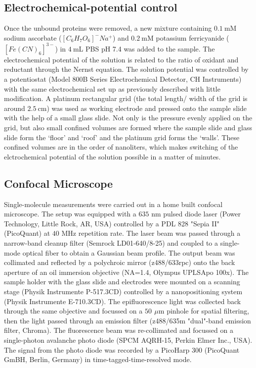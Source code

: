 \documentclass[journal=jacsat,manuscript=article]{achemso}
\newcommand{\um}{\ensuremath{\,\mu\textrm{m}}}
\begin{document}
\subsection{Electrochemical-potential control}
Once the unbound proteins were removed, a new mixture containing $0.1~$mM sodium ascorbate ($[C_6H_7O_6]^-Na^+$) and 
$0.2~$mM potassium ferricyanide ($[Fe(CN)_6]^{3-}$) in $4~$mL PBS pH 7.4 was added to the sample. The electrochemical 
potential of the solution is related to the ratio of oxidant and reductant through the Nernst equation. The solution 
potential was controlled by a potentiostat (Model 800B Series Electrochemical Detector, CH Instruments) with the same 
electrochemical set up as previously described\cite{zhang2017gold} with little modification. A platinum rectangular 
grid (the total length/ width of the grid is around $2.5~$cm) was used as working electrode and pressed onto the 
sample slide with the help of a small glass slide. Not only is the pressure evenly applied on the grid, but also small 
confined volumes are formed where the sample slide and glass slide form the `floor' and `roof' and the platinum grid 
forms the `walls'. These confined volumes are in the order of nanoliters, which makes switching of the elctrochemical 
potential of the solution possible in a matter of minutes.
\subsection{Confocal Microscope}
Single-molecule measurements were carried out in a home built confocal microscope. The setup was equipped with a 
$635$ nm pulsed diode laser (Power Technology, Little Rock, AR, USA) controlled by a PDL 828 "Sepia II" (PicoQuant) 
at $40$ MHz repetition rate. The laser beam was passed through a narrow-band cleanup filter (Semrock LD01-640/8-25) 
and coupled to a single-mode optical fiber to obtain a Gaussian beam profile. The output beam was collimated and 
reflected by a polychroic mirror (z488/633rpc) onto the back aperture of an oil immersion objective 
(NA=1.4, Olympus UPLSApo 100x). The sample holder with the glass slide and electrodes were mounted on a scanning 
stage (Physik Instrumente P-517.3CD) controlled by a nanopositioning system (Physik Instrumente E-710.3CD). 
The epifluorescence light was collected back through the same objective and focussed on a $50~\um$ pinhole for 
spatial filtering, then the light passed through an emission filter (z488/635m "dual"-band emission filter, Chroma). 
The fluorescence beam was re-collimated and focussed on a single-photon avalanche photo diode 
(SPCM AQRH-15, Perkin Elmer Inc., USA). The signal from the photo diode was recorded by a PicoHarp 300 
(PicoQuant GmBH, Berlin, Germany) in time-tagged-time-resolved mode.
\end{document}
